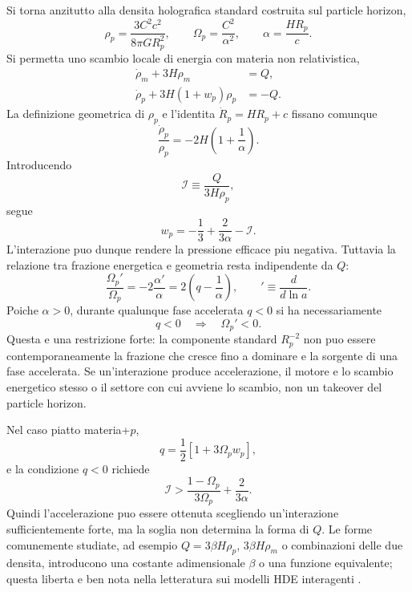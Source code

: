 \documentclass[11pt,a4paper]{article}
\begin{document}
Si torna anzitutto alla densita holografica standard costruita sul particle horizon,
\begin{equation}
 \rho_p=\frac{3C^2c^2}{8\pi G R_p^2},
 \qquad
 \Omega_p=\frac{C^2}{\alpha^2},
 \qquad
 \alpha=\frac{HR_p}{c}.
 \label{eq:r12d_rhop}
\end{equation}
Si permetta uno scambio locale di energia con materia non relativistica,
\begin{align}
 \dot\rho_m+3H\rho_m&=Q,\\
 \dot\rho_p+3H(1+w_p)\rho_p&=-Q.
 \label{eq:r12d_continuity}
\end{align}
La definizione geometrica di $\rho_p$ e l'identita $\dot R_p=HR_p+c$ fissano comunque
\begin{equation}
 \frac{\dot\rho_p}{\rho_p}=-2H\left(1+\frac1\alpha\right).
\end{equation}
Introducendo
\begin{equation}
 \mathcal I\equiv\frac{Q}{3H\rho_p},
\end{equation}
segue
\begin{equation}
 \boxed{\quad
 w_p=-\frac13+\frac{2}{3\alpha}-\mathcal I.
 \quad}
 \label{eq:r12d_wp_interacting}
\end{equation}
L'interazione puo dunque rendere la pressione efficace piu negativa. Tuttavia la relazione tra frazione energetica e geometria resta indipendente da $Q$:
\begin{equation}
 \boxed{\quad
 \frac{\Omega_p'}{\Omega_p}
 =-2\frac{\alpha'}{\alpha}
 =2\left(q-\frac1\alpha\right),
 \qquad ' \equiv \frac{d}{d\ln a}.
 \quad}
 \label{eq:r12d_omega_identity}
\end{equation}
Poiche $\alpha>0$, durante qualunque fase accelerata $q<0$ si ha necessariamente
\begin{equation}
 \boxed{\quad q<0\quad\Longrightarrow\quad \Omega_p'<0.\quad}
 \label{eq:r12d_accel_fraction_decreases}
\end{equation}
Questa e una restrizione forte: la componente standard $R_p^{-2}$ non puo essere contemporaneamente la frazione che cresce fino a dominare e la sorgente di una fase accelerata. Se un'interazione produce accelerazione, il motore e lo scambio energetico stesso o il settore con cui avviene lo scambio, non un takeover del particle horizon.

Nel caso piatto materia+$p$,
\begin{equation}
 q=\frac12\left[1+3\Omega_p w_p\right],
\end{equation}
e la condizione $q<0$ richiede
\begin{equation}
 \boxed{\quad
 \mathcal I>
 \frac{1-\Omega_p}{3\Omega_p}
 +\frac{2}{3\alpha}.
 \quad}
 \label{eq:r12d_interaction_threshold}
\end{equation}
Quindi l'accelerazione puo essere ottenuta scegliendo un'interazione sufficientemente forte, ma la soglia non determina la forma di $Q$. Le forme comunemente studiate, ad esempio $Q=3\beta H\rho_p$, $3\beta H\rho_m$ o combinazioni delle due densita, introducono una costante adimensionale $\beta$ o una funzione equivalente; questa liberta e ben nota nella letteratura sui modelli HDE interagenti \cite{FengZhang2016,WangWangLi2017}.
\end{document}
